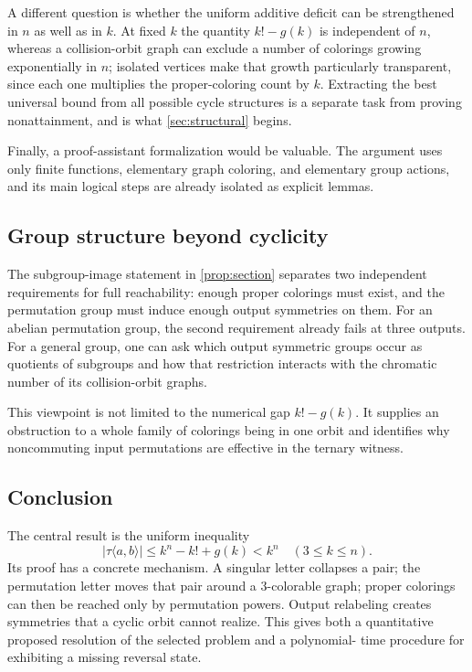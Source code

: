 \documentclass[11pt,a4paper]{article}
\numberwithin{equation}{section}
\theoremstyle{definition}
\theoremstyle{remark}
\begin{document}
A different question is whether the uniform additive deficit can be
strengthened in $n$ as well as in $k$. At fixed $k$ the quantity $k!-g(k)$ is
independent of $n$, whereas a collision-orbit graph can exclude a number of
colorings growing exponentially in $n$; isolated vertices make that growth
particularly transparent, since each one multiplies the proper-coloring count
by $k$. Extracting the best universal bound from all possible cycle
structures is a separate task from proving nonattainment, and is what
\cref{sec:structural} begins.

Finally, a proof-assistant formalization would be valuable. The argument uses
only finite functions, elementary graph coloring, and elementary group
actions, and its main logical steps are already isolated as explicit lemmas.

\subsection{Group structure beyond cyclicity}

The subgroup-image statement in \cref{prop:section} separates two independent
requirements for full reachability: enough proper colorings must exist, and
the permutation group must induce enough output symmetries on them. For an
abelian permutation group, the second requirement already fails at three
outputs. For a general group, one can ask which output symmetric groups
occur as quotients of subgroups and how that restriction interacts with the
chromatic number of its collision-orbit graphs.

This viewpoint is not limited to the numerical gap $k!-g(k)$. It supplies an
obstruction to a whole family of colorings being in one orbit and identifies
why noncommuting input permutations are effective in the ternary witness.

\subsection{Conclusion}

The central result is the uniform inequality
\[
 \boxed{\ |\tau\langle a,b\rangle|\le k^n-k!+g(k)<k^n
          \quad(3\le k\le n).\ }
\]
Its proof has a concrete mechanism. A singular letter collapses a pair; the
permutation letter moves that pair around a $3$-colorable graph; proper
colorings can then be reached only by permutation powers. Output relabeling
creates symmetries that a cyclic orbit cannot realize. This gives both a
quantitative proposed resolution of the selected problem and a polynomial-
time procedure for exhibiting a missing reversal state.
\end{document}
